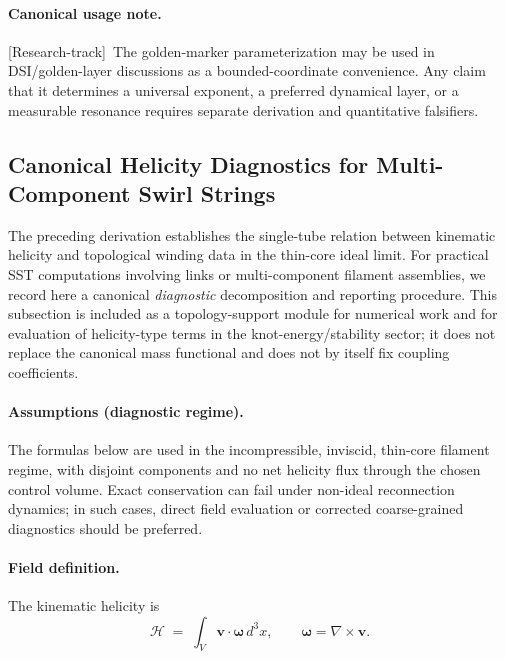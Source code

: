 \documentclass[10pt]{article}
\newcommand{\statusResearch}{\textsf{[Research-track]}}
\begin{document}
    \paragraph{Canonical usage note.}
    \statusResearch\ The golden-marker parameterization may be used in DSI/golden-layer
    discussions as a bounded-coordinate convenience. Any claim that it determines
    a universal exponent, a preferred dynamical layer, or a measurable resonance
    requires separate derivation and quantitative falsifiers.


    \subsection{Canonical Helicity Diagnostics for Multi-Component Swirl Strings}
    \label{app:helicity_diagnostics_multicomponent}

    The preceding derivation establishes the single-tube relation between kinematic helicity and topological winding data in the thin-core ideal limit. For practical SST computations involving links or multi-component filament assemblies, we record here a canonical \emph{diagnostic} decomposition and reporting procedure. This subsection is included as a topology-support module for numerical work and for evaluation of helicity-type terms in the knot-energy/stability sector; it does not replace the canonical mass functional and does not by itself fix coupling coefficients.

    \paragraph{Assumptions (diagnostic regime).}
    The formulas below are used in the incompressible, inviscid, thin-core filament regime, with disjoint components and no net helicity flux through the chosen control volume. Exact conservation can fail under non-ideal reconnection dynamics; in such cases, direct field evaluation or corrected coarse-grained diagnostics should be preferred.

    \paragraph{Field definition.}
    The kinematic helicity is
    \begin{equation}
        \mathcal{H} \;=\; \int_V \mathbf{v}\cdot\boldsymbol{\omega}\,d^3x,
        \qquad
        \boldsymbol{\omega}=\nabla\times\mathbf{v}.
    \end{equation}
\end{document}
